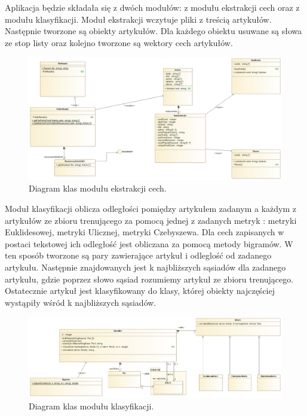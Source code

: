 \documentclass{classrep}
\begin{document}
Aplikacja będzie składała się z dwóch modułów: z modułu ekstrakcji cech oraz z modułu klasyfikacji. Moduł ekstrakcji wczytuje pliki z treścią artykułów. Następnie tworzone są obiekty artykułów. Dla każdego obiektu usuwane są słowa ze stop listy oraz kolejno tworzone są wektory cech artykułów. 

\begin{figure}[h!]
 \centering
 \includegraphics[width=14cm]{Ekstrakcja.png}
 \vspace{-0.3cm}
 \caption{Diagram klas modułu ekstrakcji cech. }
 \label{rysunek do eksperymentu 1 wariantu 1}
\end{figure}
\newpage

Moduł klasyfikacji oblicza odległości pomiędzy artykułem zadanym a każdym z artykułów ze zbioru trenującego za pomocą jednej z zadanych metryk \cite{dane} : metryki Euklidesowej, metryki Ulicznej, metryki Czebyszewa. Dla cech zapisanych w postaci tekstowej ich odległość jest obliczana za pomocą metody bigramów. W ten sposób tworzone są pary zawierające artykuł i odleglość od zadanego artykułu. Następnie znajdowanych jest k najbliższych sąsiadów dla zadanego artykułu, gdzie poprzez słowo sąsiad rozumiemy artykuł ze zbioru trenującego. Ostatecznie artykuł jest klasyfikowany do klasy, której obiekty najczęściej wystąpiły wśród k najbliższych sąsiadów. 

\begin{figure}[h!]
 \centering
 \includegraphics[width=14cm]{Klasyfikator.png}
 \vspace{-0.3cm}
 \caption{Diagram klas modułu klasyfikacji. }
 \label{rysunek do eksperymentu 1 wariantu 1}
\end{figure}
\end{document}
